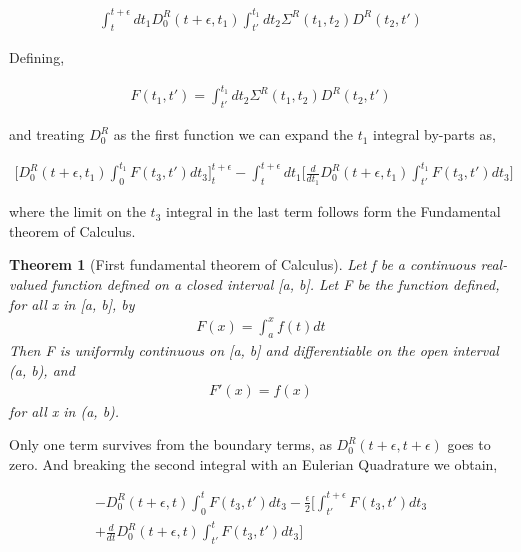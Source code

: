 \documentclass{amsart}
\newtheorem{thm}[]{Theorem}
\begin{document}
     \begin{align}
         \int^{t+\epsilon}_{t} dt_1 D_0^R(t+\epsilon, t_1)\int^{t_1}_{t'} dt_2  \Sigma^R (t_1,t_2) D^R(t_2, t')
    \end{align}
    
    Defining,
    
    \begin{align}
              F(t_1,t') = \int^{t_1}_{t'} dt_2  \Sigma^R (t_1,t_2) D^R(t_2, t')
    \end{align}
    
    and treating $D_0^R$ as the first function we can expand the $t_1$ integral by-parts as,
    
        \begin{multline}\label{byparts1}
            \Big[D_0^R(t+\epsilon, t_1)\int^{t_1}_{0}F(t_3,t')dt_3 \Big]^{t+\epsilon}_{t}-\int^{t+\epsilon}_t dt_1 \Big[\frac{d}{dt_1} D_0^R(t+\epsilon,t_1)\int^{t_1}_{t'} F(t_3,t')dt_3\Big]
        \end{multline} 
    
    where the limit on the $t_3$ integral in the last term follows form the Fundamental theorem of Calculus. 
    
    \begin{thm}[First fundamental theorem of Calculus]
        
        Let f be a continuous real-valued function defined on a closed interval [a, b]. Let F be the function defined, for all x in [a, b], by
            \begin{align*}
              F ( x ) = \int_a^x f ( t ) d t   
            \end{align*}
        Then F is uniformly continuous on [a, b] and differentiable on the open interval (a, b), and
            \begin{align*}
                 F' ( x ) = f ( x )
            \end{align*}
        for all x in (a, b). 
    \end{thm}
    
    Only one term survives from the boundary terms, as $D_0^R(t+\epsilon,t+\epsilon)$ goes to zero. And breaking the second integral with an Eulerian Quadrature we obtain,
    
        \begin{multline}\label{byparts2}
            -D_0^R(t+\epsilon, t)\int^{t}_{0}F(t_3,t')dt_3 -\frac{\epsilon}{2} \Big[ \int^{t+\epsilon}_{t'} F(t_3,t')dt_3 \\+\frac{d}{dt} D_0^R(t+\epsilon,t)\int^{t}_{t'} F(t_3,t')dt_3\Big]
        \end{multline} 
        
\end{document}

